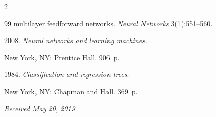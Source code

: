 \begin{multicols}{2}
{{\begin{thebibliography}{99}
 multilayer feedforward networks. \textit{Neural Networks} 3(1):551--560.




 2008. \textit{Neural networks and learning machines}. 


New York, NY: Prentice Hall. 906~p.






1984. \textit{Classification and regression trees}.


New York,  NY: Chapman and Hall. 369~p.
















 \end{thebibliography}





 }


 }





\end{multicols}





\vspace*{-6pt}





\hfill{\small\textit{Received May 20, 2019}}















